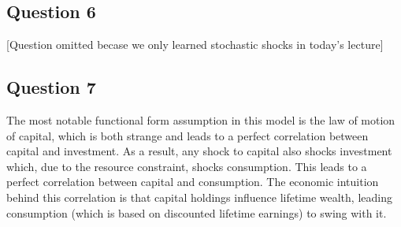 \documentclass{article}
\begin{document}

\subsection*{Question 6}
[Question omitted becase we only learned stochastic shocks in today's lecture]


\subsection*{Question 7}

The most notable functional form assumption in this model is the law of motion of capital, which is both strange and leads to a perfect correlation between capital and investment. As a result, any shock to capital also shocks investment which, due to the resource constraint, shocks consumption. This leads to a perfect correlation between capital and consumption. The economic intuition behind this correlation is that capital holdings influence lifetime wealth, leading consumption (which is based on discounted lifetime earnings) to swing with it.

\end{document}

